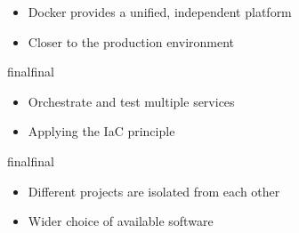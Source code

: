 \documentclass{beamer}
\def\final{final}
\def\status{final}
\begin{document}


\begin{frame}{}
  \begin{block}{}
    \begin{itemize}
      \item Docker provides a unified, independent platform
      \item Closer to the production environment
    \end{itemize}
  \end{block}

  \ifx\status\final{}
    \pause{}
  \fi


  \begin{block}{}
    \begin{itemize}
      \item Orchestrate and test multiple services
      \item Applying the IaC principle
    \end{itemize}
  \end{block}

  \ifx\status\final{}
    \pause{}
  \fi


  \begin{block}{}
    \begin{itemize}
      \item Different projects are isolated from each other
      \item Wider choice of available software
    \end{itemize}
  \end{block}
\end{frame}
\end{document}
